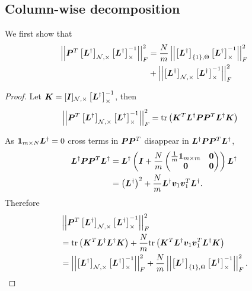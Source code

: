 \subsection{Column-wise decomposition}
\label{subapp:GLR_Proof:column_decomp}
We first show that 
\begin{align}
    \sqfrob{\matr{P}^{T}\msub[N,\Theta]{\matr{L}^{\dagger}}\msub[\Theta]{\matr{L}^{\dagger}}^{-1}} &= \frac{N}{m}\sqfrob{\msubgen[\{1\},\Theta]{\matr{L}^{\dagger}}\msub[\Theta]{\matr{L}^{\dagger}}^{-1}}  \\
    &+ \sqfrob{\msub[N,\Theta]{\matr{L}^{\dagger}}\msub[\Theta]{\matr{L}^{\dagger}}^{-1}} \label{eq:GLR_Proof:extract_P_frob}
\end{align}
\begin{proof} 

Let $\matr{K} = \matrsub[N,\Theta]{I}\msub[\Theta]{\matr{L}^{\dagger}}^{-1}$, then 
\begin{align} \sqfrob{\matr{P}^{T}\msub[N,\Theta]{\matr{L}^{\dagger}}\msub[\Theta]{\matr{L}^{\dagger}}^{-1}} &= \textrm{tr}\left(\matr{K}^{T}\matr{L}^{\dagger} \matr{P}\matr{P}^{T} \matr{L}^{\dagger}\matr{K}
 \right)
\end{align}

    As $\bm{1}_{m \times N}\bm{L}^{\dagger} = 0$ cross terms in $\bm{P}\bm{P}^{T}$ disappear in $\bm{L}^{\dagger}\bm{P}\bm{P}^{T}\bm{L}^{\dagger}$, 
    \begin{align}
    \bm{L}^{\dagger}\bm{P}\bm{P}^{T}\bm{L}^{\dagger}  &= \bm{L}^{\dagger}\left(\bm{I} + \frac{N}{m} \begin{pmatrix}
        \frac{1}{m}\bm{1}_{m \times m} & \bm{0}\\
        \bm{0} & \bm{0}
    \end{pmatrix} \right)\bm{L}^{\dagger} \\
    &= \left(\bm{L}^{\dagger}\right)^{2} + \frac{N}{m} \bm{L}^{\dagger}\bm{v}_{1}\bm{v}_{1}^{T}\bm{L}^{\dagger}.
    \label{eq:P_rearrangement_with_extra}
    \end{align}
Therefore
\begin{align}
    &\sqfrob{\matr{P}^{T}\msub[N,\Theta]{\matr{L}^{\dagger}}\msub[\Theta]{\matr{L}^{\dagger}}^{-1}} \\
    &= \trace{\matr{K}^{T}\matr{L}^{\dagger}\matr{L}^{\dagger}\matr{K}} + \frac{N}{m}\trace{\matr{K}^{T}\matr{L}^{\dagger}\vect{v}_{1}\vect{v}_{1}^{T}\matr{L}^{\dagger}\matr{K}} \\
    &=  \sqfrob{\msub[N,\Theta]{\matr{L}^{\dagger}}\msub[\Theta]{\matr{L}^{\dagger}}^{-1}} + \frac{N}{m}\sqfrob{\msubgen[\{1\},\Theta]{\matr{L}^{\dagger}}\msub[\Theta]{\matr{L}^{\dagger}}^{-1}}.
\end{align}
\end{proof}

